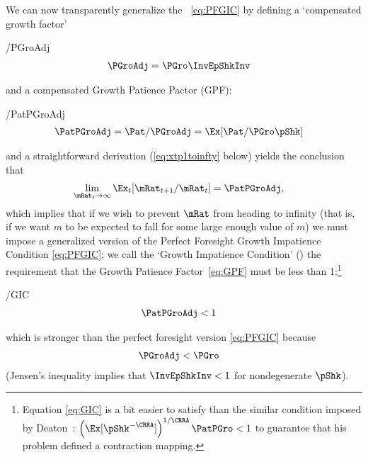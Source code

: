 \documentclass[BufferStockTheory]{subfiles}
\begin{document}
\hypertarget{GIC}{}
\hypertarget{GICI}{}
\hypertarget{PGroAdj}{}
We can now transparently generalize the \PFGIC~\eqref{eq:PFGIC} by defining a `compensated growth factor' \hypertarget{GPF}{}
\begin{verbatimwrite}{\EqDir/PGroAdj}
  \begin{align}
    \PGroAdj  & =  \PGro \InvEpShkInv \label{eq:PGroAdj}
  \end{align}
\end{verbatimwrite}

and a compensated Growth Patience Pactor (GPF):
\begin{verbatimwrite}{\EqDir/PatPGroAdj}
  \begin{align}
    \PatPGroAdj  & = \Pat/\PGroAdj = \Ex[\Pat/\PGro\pShk]  \label{eq:GPF} 
  \end{align}
\end{verbatimwrite}

and a straightforward derivation (\eqref{eq:xtp1toinfty} below) yields the conclusion that
\begin{align*}
  \lim_{\mRat_{t} \rightarrow \infty} \Ex_{t}[\mRat_{t+1}/\mRat_{t}]  & = \PatPGroAdj,
\end{align*}
which implies that if we wish to prevent $\mRat$ from heading to infinity (that is, if we want $m$ to be expected to fall for some large enough value of $m$) we must impose a generalized version of the Perfect Foresight Growth Impatience Condition \eqref{eq:PFGIC}; we call the `Growth Impatience Condition' (\GIC) the requirement that the Growth Patience Factor~\eqref{eq:GPF} must be less than 1:\footnote{Equation \eqref{eq:GIC} is a bit easier to satisfy than the similar condition imposed by Deaton~\citeyearpar{deatonLiqConstr}: $\left(\Ex[\pShk^{-\CRRA}]\right)^{1/\CRRA} \PatPGro < 1$ to guarantee that his problem defined a contraction mapping.}  
\begin{verbatimwrite}{\EqDir/GIC}
  \begin{align}
    \PatPGroAdj  & < 1 \label{eq:GIC}
  \end{align}\end{verbatimwrite}

which is stronger than the perfect foresight version \eqref{eq:PFGIC} because
\begin{align}
  \PGroAdj & < \PGro \label{eq:PGroAdjLTPGro}
\end{align}
(Jensen's inequality implies that $\InvEpShkInv < 1$ for nondegenerate $\pShk$).

\hypertarget{Autarky-Value}{}
\end{document}

